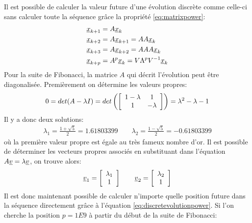 Il est possible de calculer la valeur future d'une évolution discrète comme celle-ci sans calculer toute la séquence grâce la propriété \eqref{eq:matrixpower}:
\begin{align}
	\underline{x}_{k+1} &= A \underline{x}_{k} \\
	\underline{x}_{k+2} &= A \underline{x}_{k+1} = A A \underline{x}_{k} \\
	\underline{x}_{k+3} &= A \underline{x}_{k+2} = A A A \underline{x}_{k} \\
	\underline{x}_{k+p} &= A^p \underline{x}_{k} = V \Lambda^p V^{-1} \underline{x}_{k}
	\label{eq:discretevolutionpower}
\end{align}
Pour la suite de Fibonacci, la matrice $A$ qui décrit l'évolution peut être diagonalisée. Premièrement on détermine les valeurs propres:
\begin{align}
	0
	=
	det(A - \lambda I)
	=
	det\left(
	\left[ \begin{array}{c c}
			   1-\lambda & 1 \\ 1 & -\lambda
	\end{array} \right]
	\right)
	=
	\lambda^2 - \lambda -1
\end{align}
Il y a donc deux solutions:
\begin{align}
	\lambda_1 = \frac{1 + \sqrt{5}}{2} = 1.61803399 \quad\quad \lambda_2 = \frac{1 - \sqrt{5}}{2} = -0.61803399
\end{align}
où la première valeur propre est égale au très fameux nombre d'or. Il est possible de déterminer les vecteurs propres associés en substituant dans l'équation $A \underline{v} = \lambda \underline{v}$, on trouve alors:
\begin{align}
	\underline{v}_1 =
	\left[ \begin{array}{c}
			   \lambda_1 \\ 1
	\end{array} \right]
	\quad\quad
	\underline{v}_2 =
	\left[ \begin{array}{c}
			   \lambda_2 \\ 1
	\end{array} \right]
\end{align}
Il est donc maintenant possible de calculer n'importe quelle position future dans la séquence directement grâce à l'équation \eqref{eq:discretevolutionpower}. Si l'on cherche la position $p=1E9$ à partir du début de la suite de Fibonacci:
